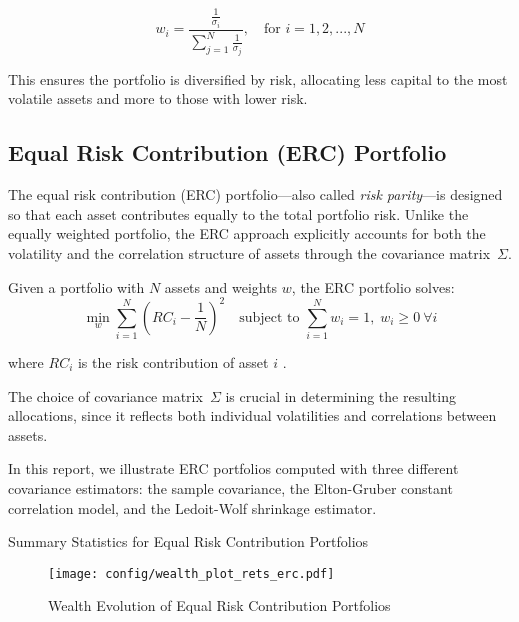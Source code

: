 \documentclass{article}
\begin{document}
\[
w_i = \frac{\frac{1}{\sigma_i}}{\sum_{j=1}^{N} \frac{1}{\sigma_j}}, \quad \text{for } i = 1, 2, ..., N
\]

This ensures the portfolio is diversified by risk, allocating less capital to the most volatile assets and more to those with lower risk.


\newpage

\subsection{Equal Risk Contribution (ERC) Portfolio}

The equal risk contribution (ERC) portfolio---also called \textit{risk parity}---is designed so that each asset contributes equally to the total portfolio risk. 
Unlike the equally weighted portfolio, the ERC approach explicitly accounts for both the volatility and the correlation structure of assets through the covariance matrix~$\Sigma$.

Given a portfolio with $N$ assets and weights $w$, the ERC portfolio solves:
\[
\min_{w} \sum_{i=1}^N \left( RC_i - \frac{1}{N} \right)^2 
\quad \text{subject to } \sum_{i=1}^N w_i = 1, \; w_i \geq 0 \ \forall i
\]

where $RC_i$ is the risk contribution of asset $i$ .

The choice of covariance matrix~$\Sigma$ is crucial in determining the resulting allocations, since it reflects both individual volatilities and correlations between assets.

In this report, we illustrate ERC portfolios computed with three different covariance estimators: the sample covariance, the Elton-Gruber constant correlation model, and the Ledoit-Wolf shrinkage estimator.




\begin{table}[htbp]
\centering
\caption{Summary Statistics for Equal Risk Contribution Portfolios}
\label{tab:stats_erc}
\begin{adjustbox}{max width=\textwidth}
    
\end{adjustbox}
\end{table}


\begin{figure}[htbp]
    \centering
    \texttt{[image: config/wealth\_plot\_rets\_erc.pdf]}
    \caption{Wealth Evolution of Equal Risk Contribution Portfolios}
    \label{fig:wealth_erc}
\end{figure}
\end{document}
